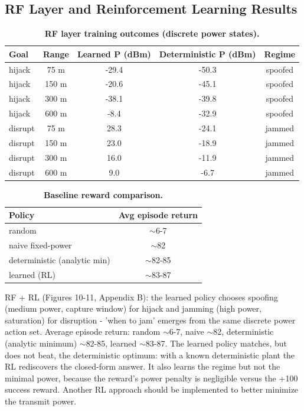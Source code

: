 \documentclass[11pt]{article}
\begin{document}
\subsection*{RF Layer and Reinforcement Learning Results}

\begin{table}[H]\centering\small
\caption{\textbf{RF layer training outcomes (discrete power states).}}
\begin{tabular}{lcccc}
\toprule
\textbf{Goal} & \textbf{Range} & \textbf{Learned P (dBm)} & \textbf{Deterministic P (dBm)} & \textbf{Regime} \\
\midrule
hijack & 75 m & -29.4 & -50.3 & spoofed\\
hijack & 150 m & -20.6 & -45.1 & spoofed\\
hijack & 300 m & -38.1 & -39.8 & spoofed\\
hijack & 600 m & -8.4 & -32.9 & spoofed\\
disrupt & 75 m & 28.3 & -24.1 & jammed\\
disrupt & 150 m & 23.0 & -18.9 & jammed\\
disrupt & 300 m & 16.0 & -11.9 & jammed\\
disrupt & 600 m & 9.0 & -6.7 & jammed \\
\bottomrule
\end{tabular}
\end{table}

\begin{table}[H]\centering\small
\caption{\textbf{Baseline reward comparison.}}
\begin{tabular}{lc}
\toprule
\textbf{Policy} & \textbf{Avg episode return} \\
\midrule
random & $\sim$6-7\\
naive fixed-power & $\sim$82\\
deterministic (analytic min) & $\sim$82-85\\
learned (RL) & $\sim$83-87 \\
\bottomrule
\end{tabular}
\end{table}

RF + RL (Figures 10-11, Appendix B): the learned policy chooses spoofing (medium power, capture window) for hijack and jamming (high power, saturation) for disruption - 'when to jam' emerges from the same discrete power action set. Average episode return: random $\sim$6-7, naive $\sim$82, deterministic (analytic minimum) $\sim$82-85, learned $\sim$83-87. The learned policy matches, but does not beat, the deterministic optimum: with a known deterministic plant the RL rediscovers the closed-form answer. It also learns the regime but not the minimal power, because the reward's power penalty is negligible versus the +100 success reward. Another RL approach should be implemented to better minimize the transmit power.
\end{document}
